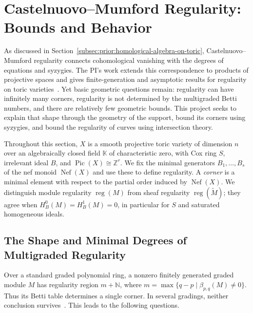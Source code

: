 \documentclass[11pt,reqno]{amsart}
\theoremstyle{remark}
\newcommand{\reg}{\operatorname{reg}}
\newcommand{\Pic}{\operatorname{Pic}}
\newcommand{\Nef}{\operatorname{Nef}}
\newcommand{\KK}{\mathbb{K}}
\newcommand{\NN}{\mathbb{N}}
\newcommand{\ZZ}{\mathbb{Z}}
\begin{document}
	
\section{Castelnuovo–Mumford Regularity: Bounds and Behavior}\label{sec:multigraded-regularity}

As discussed in Section~\ref{subsec:prior:homological-algebra-on-toric}, Castelnuovo--Mumford regularity connects cohomological vanishing with the degrees of equations and syzygies. The PI's work extends this correspondence to products of projective spaces and gives finite-generation and asymptotic results for regularity on toric varieties~\cite{bruceHellerSayrafi26,bruceHellerSayrafi22}. Yet basic geometric questions remain: regularity can have infinitely many corners, regularity is not determined by the multigraded Betti numbers, and there are relatively few geometric bounds. This project seeks to explain that shape through the geometry of the support, bound its corners using syzygies, and bound the regularity of curves using intersection theory.

Throughout this section, $X$ is a smooth projective toric variety of dimension $n$ over an algebraically closed field $\KK$ of characteristic zero, with Cox ring $S$, irrelevant ideal $B$, and $\Pic(X)\cong\ZZ^r$. We fix the minimal generators $B_1,\ldots,B_s$ of the nef monoid $\Nef(X)$ and use these to define regularity. A \emph{corner} is a minimal element with respect to the partial order induced by $\Nef(X)$. We distinguish module regularity $\reg(M)$ from sheaf regularity $\reg(\widetilde M)$; they agree when $H_B^0(M)=H_B^1(M)=0$, in particular for $S$ and saturated homogeneous ideals.

\subsection{The Shape and Minimal Degrees of Multigraded Regularity}\label{subsec:shape-of-regularity}

Over a standard graded polynomial ring, a nonzero finitely generated graded module $M$ has regularity region $m+\NN$, where $m=\max\{q-p\mid\beta_{p,q}(M)\neq0\}$. Thus its Betti table determines a single corner. In several gradings, neither conclusion survives~\cite{bruceHellerSayrafi26,bruceHellerSayrafi22}. This leads to the following questions.
\end{document}
